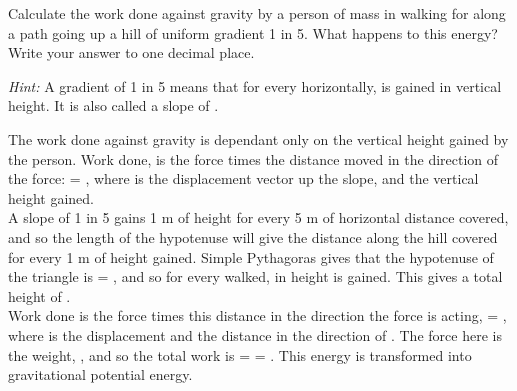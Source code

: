 
\begin{problem}[O1980PIQ2a]%
{Calculate the work done against gravity by a person of mass  in walking for  along a path going up a hill of uniform gradient 1 in 5. What happens to this energy? Write your answer to one decimal place.

\emph{Hint:} A gradient of 1 in 5 means that for every  horizontally,  is gained in vertical height. It is also called a slope of .}
{}
{The work done against gravity is dependant only on the vertical height gained by the person. Work done,  is the force times the distance moved in the direction of the force:  = , where  is the displacement vector up the slope, and  the vertical height gained. \\

A slope of 1 in 5 gains 1 m of height for every 5 m of horizontal distance covered, and so the length of the hypotenuse will give the distance along the hill covered for every 1 m of height gained. Simple Pythagoras gives that the hypotenuse of the triangle is  = , and so for every  walked,  in height is gained. This gives a total height of .\\

Work done is the force times this distance in the direction the force is acting,  = , where  is the displacement and  the distance in the direction of . The force here is the weight, , and so the total work is  =  = . This energy is transformed into gravitational potential energy.
}
\end{problem}
